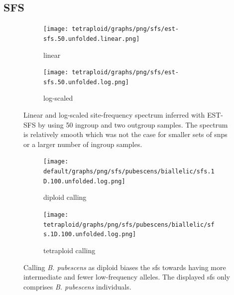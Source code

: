 \documentclass[hidelinks,11pt]{article}
\newcommand{\pubescens}{\textit{B. pubescens}}
\begin{document}
    \clearpage

    \subsection{SFS}
    \label{sec:appendix-sfs}

    \begin{figure}[ht]
        \centering
        \begin{subfigure}[b]{0.52\textwidth}
            \centering
            \texttt{[image: tetraploid/graphs/png/sfs/est-sfs.50.unfolded.linear.png]}
            \caption{linear}
            \label{fig:est_sfs_linear}
        \end{subfigure}
        \hspace{-2em}
        \begin{subfigure}[b]{0.52\textwidth}
            \centering
            \texttt{[image: tetraploid/graphs/png/sfs/est-sfs.50.unfolded.log.png]}
            \caption{log-scaled}
            \label{fig:est_sfs_log}
        \end{subfigure}
        \caption{Linear and log-scaled site-frequency spectrum inferred with EST-SFS by using 50 ingroup and two outgroup samples. The spectrum is relatively smooth which was not the case for smaller sets of \acrshort{snp}s or a larger number of ingroup samples.}
        \label{fig:est_sfs}
    \end{figure}

    \begin{figure}[H]
        \centering
        \begin{subfigure}[b]{0.52\textwidth}
            \centering
            \texttt{[image: default/graphs/png/sfs/pubescens/biallelic/sfs.1D.100.unfolded.log.png]}
            \caption{diploid calling}
        \end{subfigure}
        \hspace{-2em}
        \begin{subfigure}[b]{0.52\textwidth}
            \centering
            \texttt{[image: tetraploid/graphs/png/sfs/pubescens/biallelic/sfs.1D.100.unfolded.log.png]}
            \caption{tetraploid calling}
        \end{subfigure}
        \caption{Calling \pubescens{} as diploid biases the \acrshort{sfs} towards having more intermediate and fewer low-frequency alleles. The displayed \acrshort{sfs} only comprises \pubescens{} individuals.}
        \label{fig:sfs_ploidy_calling_differences}
    \end{figure}
\end{document}
